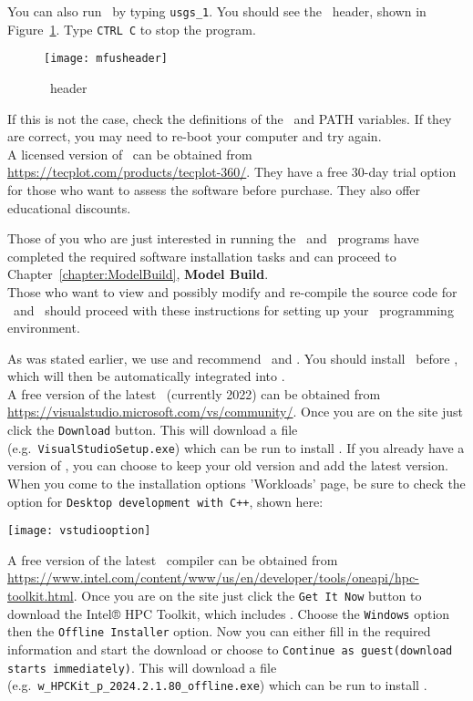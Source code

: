 You can also run \mfus\ by typing \texttt{usgs\_1}.  You should see the \mfus\ header, shown in Figure~\ref{fig:mfusheader}. Type \texttt{CTRL C} to stop the program.
\begin{figure}
    \texttt{[image: mfusheader]}
    \caption{\mfus\ header}
    \label{fig:mfusheader}
\end{figure}

If this is not the case, check the definitions of the \bin\ and PATH variables.  If they are correct, you may need to re-boot your computer and try again. \\

A licensed version of \tecplot\ can be obtained from \url{https://tecplot.com/products/tecplot-360/}.  They have a free 30-day trial option for those who want to assess the software before purchase.  They also offer educational discounts.

Those of you who are just interested in running the \mut\ and \mfus\ programs have completed the required  software installation tasks and can proceed to Chapter~\ref{chapter:ModelBuild}, \textbf{Model Build}. \\

Those who want to view and possibly modify and re-compile the source code for \mut\ and \mfus\ should proceed with these instructions for setting up your \windows\ programming environment.

As was stated earlier, we use and recommend \vstudio\ and \ifort. You should install \vstudio\ before \ifort, which will then be automatically integrated into \vstudio. \\

A free version of the latest \vstudio\ (currently 2022) can be obtained from \url{https://visualstudio.microsoft.com/vs/community/}. Once you are on the site just click the \texttt{Download} button.  This will download a file (e.g.\ \texttt{VisualStudioSetup.exe}) which can be run to install \vstudio.  If you already have a version of \vstudio, you can choose to keep your old version and add the latest version.  When you come to the installation options 'Workloads' page, be sure to check the option for \texttt{Desktop development with C++}, shown here:

\texttt{[image: vstudiooption]}

A free version of the latest \ifort\ compiler can be obtained from \url{https://www.intel.com/content/www/us/en/developer/tools/oneapi/hpc-toolkit.html}.
Once you are on the site just click the \texttt{Get It Now} button to download the Intel® HPC Toolkit, which includes \ifort.  Choose the \texttt{Windows} option then the \texttt{Offline Installer} option. Now you can either fill in the required information and start the download or choose to \texttt{Continue as guest(download starts immediately)}.  This will download a file (e.g.\ \texttt{w\_HPCKit\_p\_2024.2.1.80\_offline.exe}) which can be run to install \ifort.

